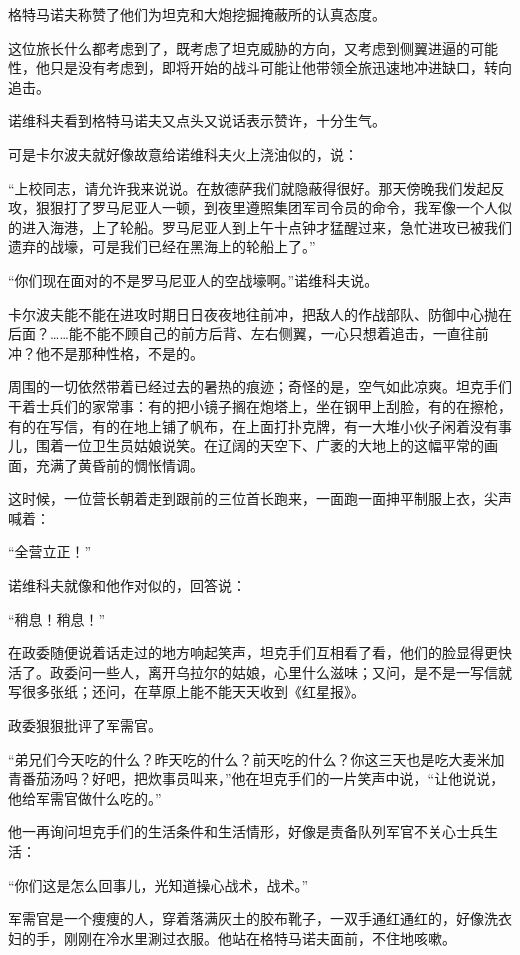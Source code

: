 格特马诺夫称赞了他们为坦克和大炮挖掘掩蔽所的认真态度。

这位旅长什么都考虑到了，既考虑了坦克威胁的方向，又考虑到侧翼进逼的可能性，他只是没有考虑到，即将开始的战斗可能让他带领全旅迅速地冲进缺口，转向追击。

诺维科夫看到格特马诺夫又点头又说话表示赞许，十分生气。

可是卡尔波夫就好像故意给诺维科夫火上浇油似的，说：

“上校同志，请允许我来说说。在敖德萨我们就隐蔽得很好。那天傍晚我们发起反攻，狠狠打了罗马尼亚人一顿，到夜里遵照集团军司令员的命令，我军像一个人似的进入海港，上了轮船。罗马尼亚人到上午十点钟才猛醒过来，急忙进攻已被我们遗弃的战壕，可是我们已经在黑海上的轮船上了。”

“你们现在面对的不是罗马尼亚人的空战壕啊。”诺维科夫说。

卡尔波夫能不能在进攻时期日日夜夜地往前冲，把敌人的作战部队、防御中心抛在后面？……能不能不顾自己的前方后背、左右侧翼，一心只想着追击，一直往前冲？他不是那种性格，不是的。

周围的一切依然带着已经过去的暑热的痕迹；奇怪的是，空气如此凉爽。坦克手们干着士兵们的家常事：有的把小镜子搁在炮塔上，坐在钢甲上刮脸，有的在擦枪，有的在写信，有的在地上铺了帆布，在上面打扑克牌，有一大堆小伙子闲着没有事儿，围着一位卫生员姑娘说笑。在辽阔的天空下、广袤的大地上的这幅平常的画面，充满了黄昏前的惆怅情调。

这时候，一位营长朝着走到跟前的三位首长跑来，一面跑一面抻平制服上衣，尖声喊着：

“全营立正！”

诺维科夫就像和他作对似的，回答说：

“稍息！稍息！”

在政委随便说着话走过的地方响起笑声，坦克手们互相看了看，他们的脸显得更快活了。政委问一些人，离开乌拉尔的姑娘，心里什么滋味；又问，是不是一写信就写很多张纸；还问，在草原上能不能天天收到《红星报》。

政委狠狠批评了军需官。

“弟兄们今天吃的什么？昨天吃的什么？前天吃的什么？你这三天也是吃大麦米加青番茄汤吗？好吧，把炊事员叫来，”他在坦克手们的一片笑声中说，“让他说说，他给军需官做什么吃的。”

他一再询问坦克手们的生活条件和生活情形，好像是责备队列军官不关心士兵生活：

“你们这是怎么回事儿，光知道操心战术，战术。”

军需官是一个痩痩的人，穿着落满灰土的胶布靴子，一双手通红通红的，好像洗衣妇的手，刚刚在冷水里涮过衣服。他站在格特马诺夫面前，不住地咳嗽。


